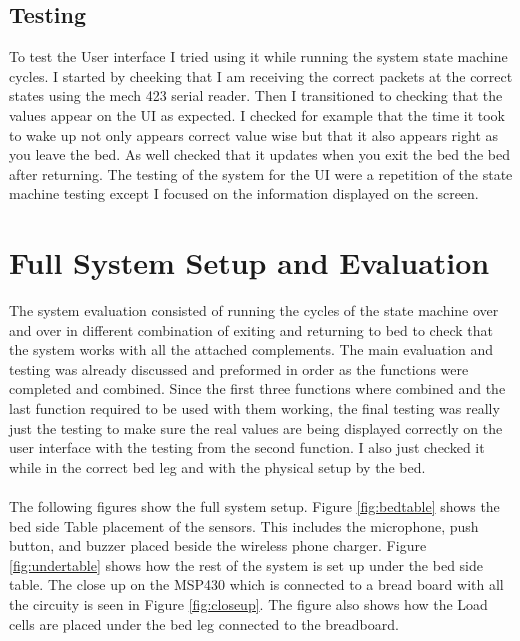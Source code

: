 \documentclass[11pt]{article}
\begin{document}
\subsection*{Testing}
To test the User interface I tried using it while running the system state machine cycles.
I started by cheeking that I  am receiving the correct packets at the correct states using the mech 423 serial reader.
Then I transitioned to checking that the values appear on the UI as expected. 
I checked for example that the time it took to wake up not only appears correct value wise but that it also appears right as you leave the bed.
As well checked that it updates when you exit the bed the bed after returning. 
The testing of the system for the UI were a repetition of the state machine testing except I focused on the information displayed on the screen.

\section{Full System Setup and Evaluation}
The system evaluation consisted of running the cycles of the state machine over and over in different combination of exiting and returning to bed to check that the system works with all the attached complements. 
The main evaluation and testing was already discussed and preformed in order as the functions were completed and combined.
Since the first three functions where combined and the last function required to be used with them working, the final testing was really just the testing to make sure the real values are being displayed correctly on the user interface with the testing from the second function.
I also just checked it while in the correct bed leg and with the physical setup by the bed.\\
\\
The following figures show the full system setup. 
Figure \ref{fig:bedtable} shows the bed side Table placement of the sensors. 
This includes the microphone, push button, and buzzer placed beside the wireless phone charger. 
Figure \ref{fig:undertable} shows how the rest of the system is set up under the bed side table. 
The close up on the MSP430 which is connected to a bread board with all the circuity is seen in Figure \ref{fig:closeup}.
The figure also shows how the Load cells are placed under the bed leg connected to the breadboard. 
\end{document}
